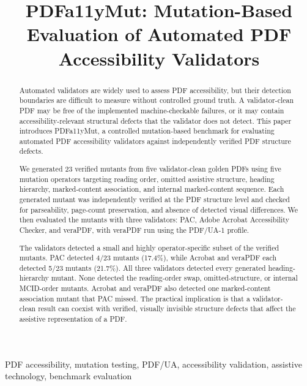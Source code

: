 \documentclass[conference]{IEEEtran}
\begin{document}
\title{PDFa11yMut: Mutation-Based Evaluation of Automated PDF Accessibility Validators}

\author{
}

\maketitle

\begin{abstract}
\normalfont
Automated validators are widely used to assess PDF accessibility, but their detection boundaries are difficult to measure without controlled ground truth. A validator-clean PDF may be free of the implemented machine-checkable failures, or it may contain accessibility-relevant structural defects that the validator does not detect. This paper introduces PDFa11yMut, a controlled mutation-based benchmark for evaluating automated PDF accessibility validators against independently verified PDF structure defects.

We generated 23 verified mutants from five validator-clean golden PDFs using five mutation operators targeting reading order, omitted assistive structure, heading hierarchy, marked-content association, and internal marked-content sequence. Each generated mutant was independently verified at the PDF structure level and checked for parseability, page-count preservation, and absence of detected visual differences. We then evaluated the mutants with three validators: PAC, Adobe Acrobat Accessibility Checker, and veraPDF, with veraPDF run using the PDF/UA-1 profile.

The validators detected a small and highly operator-specific subset of the verified mutants. PAC detected 4/23 mutants (17.4\%), while Acrobat and veraPDF each detected 5/23 mutants (21.7\%). All three validators detected every generated heading-hierarchy mutant. None detected the reading-order swap, omitted-structure, or internal MCID-order mutants. Acrobat and veraPDF also detected one marked-content association mutant that PAC missed. The practical implication is that a validator-clean result can coexist with verified, visually invisible structure defects that affect the assistive representation of a PDF.
\end{abstract}

\begin{IEEEkeywords}
PDF accessibility, mutation testing, PDF/UA, accessibility validation, assistive technology, benchmark evaluation
\end{IEEEkeywords}
\end{document}
